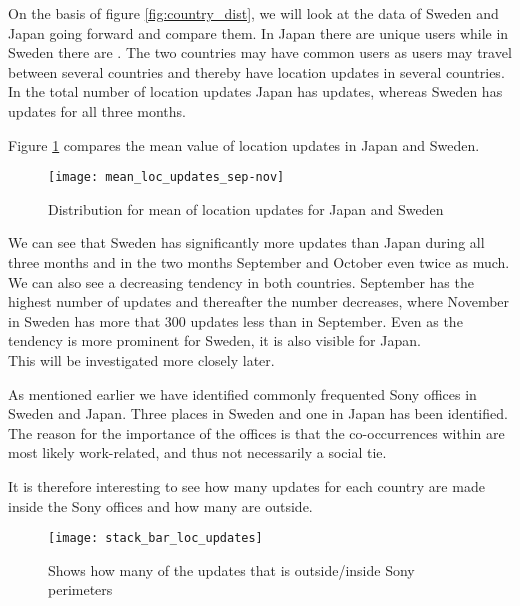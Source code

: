 On the basis of figure \ref{fig:country_dist}, we will look at the data of Sweden and Japan going forward and compare them. 
In Japan there are \numberUsersJapan{} unique users while in Sweden there are \numberUsersSweden{}. The two countries may have common users as users may travel between several countries and thereby have location updates in several countries.  
In the total number of location updates Japan has \locUpdatesJapan{} updates, whereas Sweden has \locUpdatesSweden{} updates for all three months. 

Figure \ref{fig:mean_loc_updates_sep-nov} compares the mean value of location updates in Japan and Sweden. 

\begin{figure}[H]
    \hspace*{-2.2cm}
    \centering
    \texttt{[image: mean\_loc\_updates\_sep-nov]}
    \caption{Distribution for mean of location updates for Japan and Sweden}
    \label{fig:mean_loc_updates_sep-nov}
\end{figure}


We can see that Sweden has significantly more updates than Japan during all three months and in the two months September and October even twice as much. We can also see a decreasing tendency in both countries. September has the highest number of updates and thereafter the number decreases, where November in Sweden has more that 300 updates less than in September. Even as the tendency is more prominent for Sweden, it is also visible for Japan.  \\
This will be investigated more closely later.  


As mentioned earlier we have identified commonly frequented Sony offices in Sweden and Japan. Three places in Sweden and one in Japan has been identified. The reason for the importance of the offices is that the co-occurrences within are most likely work-related, and thus not necessarily a social tie.

It is therefore interesting to see how many updates for each country are made inside the Sony offices and how many are outside.  

\begin{figure}[H]
    \hspace*{-2.2cm}
    \centering
    \texttt{[image: stack\_bar\_loc\_updates]}
    \caption{Shows how many of the updates that is outside/inside Sony perimeters}
    \label{fig:hq_stack_bar}
\end{figure}

